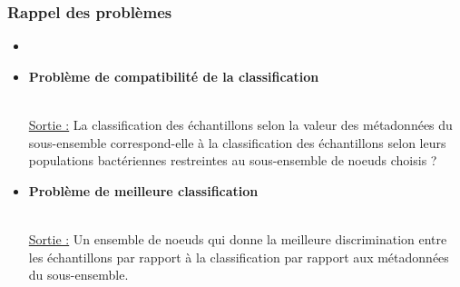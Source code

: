 \documentclass{beamer}
\begin{document}

\begin{frame}
\frametitle{Rappel des problèmes}

\begin{itemize}
\item {}
\item \begin{flushcenter} \bf Problème de compatibilité de la classification\end{flushcenter}\\ \uline{Sortie :} La classification des échantillons selon la valeur des métadonnées du sous-ensemble correspond-elle à la classification des échantillons selon leurs populations bactériennes restreintes au sous-ensemble de noeuds choisis ?
\item \begin{flushcenter} \bf Problème de meilleure classification\end{flushcenter}\\ \uline{Sortie :} Un ensemble de noeuds qui donne la meilleure discrimination entre les échantillons par rapport à la classification par rapport aux métadonnées du sous-ensemble.
\end{itemize}


\end{frame}
\end{document}
